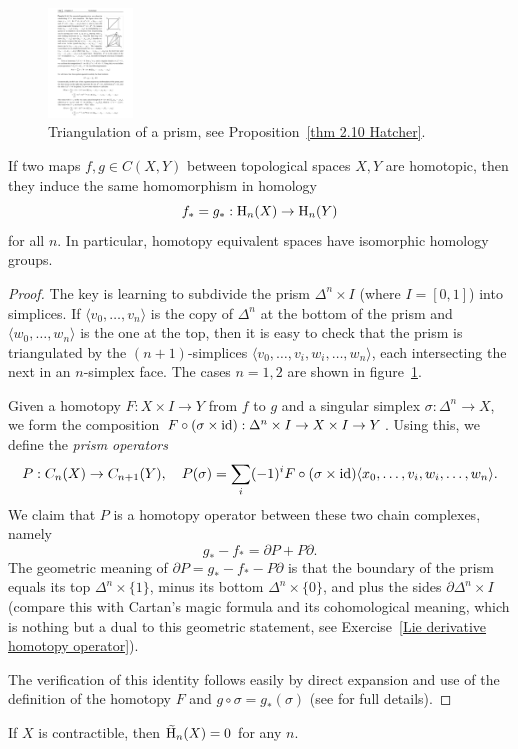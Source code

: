 \begin{figure}[tp]
    \begin{center}
        \includegraphics[width=0.2\textwidth]{figures/prism.pdf}
    \end{center}
    \caption{Triangulation of a prism, see Proposition~\ref{thm 2.10 Hatcher}.\label{Prism fig}}
\end{figure}
\begin{prop}\label{thm 2.10 Hatcher}
    If two maps $f,g\in C(X,Y)$ between topological spaces $X,Y$ are homotopic, then they induce the same homomorphism in homology
    \[f_\ast=g_\ast :\mathrm{H}_n(X)\to \mathrm{H}_n(Y)\]
    for all $n$. In particular, homotopy equivalent spaces have isomorphic homology groups.
\end{prop}
\begin{proof}
     The key is learning to subdivide the prism $\Delta^n\times I$ (where $I=[0,1]$) into simplices. If $\langle v_0,\ldots,v_n\rangle$ is the copy of $\Delta^n$ at the bottom of the prism and $\langle w_0,\ldots,w_n\rangle$ is the one at the top, then it is easy to check that the prism is triangulated by the $(n+1)$-simplices $\langle v_0,\ldots,v_i,w_i,\ldots,w_n\rangle$, each intersecting the next in an $n$-simplex face. The cases $n=1,2$ are shown in figure~\ref{Prism fig}.
     
     Given a homotopy $F:X\times I\to Y$ from $f$ to $g$ and a singular simplex $\sigma:\Delta^n\to X$, we form the composition $F\circ(\sigma\times \operatorname{id}):\Delta^n\times I\to X\times I\to Y$. Using this, we define the \emph{prism operators}
     \[P:C_n(X)\to C_{n+1}(Y),\quad P(\sigma)=\sum_i(-1)^i F\circ (\sigma\times\operatorname{id})\langle x_0,\ldots,v_i,w_i,\ldots,w_n\rangle.\]
     We claim that $P$ is a homotopy operator between these two chain complexes, namely
     \[g_\ast-f_\ast=\partial P+P\partial.\]
     The geometric meaning of $\partial P=g_\ast-f_\ast-P\partial$ is that the boundary of the prism equals its top $\Delta^n\times\{1\}$, minus its bottom $\Delta^n\times\{0\}$, and plus the sides $\partial\Delta^n\times I$ (compare this with Cartan's magic formula and its cohomological meaning, which is nothing but a dual to this geometric statement, see Exercise~\ref{Lie derivative homotopy operator}).
     
     The verification of this identity follows easily by direct expansion and use of the definition of the homotopy $F$ and $g\circ\sigma=g_\ast(\sigma)$ (see \cite[Thm.~2.10]{Hatcher} for full details).
\end{proof}
\begin{cor}
    If $X$ is contractible, then $\wt{\rmH}_n(X)=0$ for any $n$.
\end{cor}


